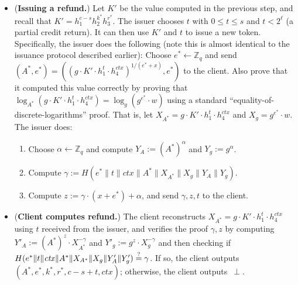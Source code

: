 \documentclass[11pt]{article}
\def\Z{{\mathbb Z}}
\def\Z{{\mathbb Z}}
\def\isequal{\stackrel{\rm ?}{=}}
\begin{document}
\begin{itemize}
\item ({\bf Issuing a refund.}) Let $K'$ be the value computed in the previous step, and recall that $K'=h_1^{c-s} h_2^{k^*} h_3^{r^*}$. The issuer chooses $t$ with $0 \leq t \leq s$ and $t < 2^\ell$ (a partial credit return). It can then use $K'$ and $t$ to issue a new token.
Specifically, the issuer does the following (note this is almost identical to the issuance protocol described earlier):
Choose
$e^* \leftarrow \Z_q$ and send
$(A^*, e^*) = \left(\left(g \cdot K' \cdot h_1^t \cdot h_4^{\mathit{ctx}}\right)^{1/(e^*+x)}, e^*\right)$
to the client.
Also prove that it computed this value correctly by proving that $\log_{A^*} \left(g \cdot K' \cdot h_1^t \cdot h_4^{\mathit{ctx}}\right) = \log_g \left(g^{e^*} \cdot w\right)$ using a standard ``equality-of-discrete-logarithms'' proof.
That is, let $X_{A^*} = g \cdot K' \cdot h_1^t \cdot h_4^{\mathit{ctx}}$ and $X_g = g^{e^*} \cdot w$. The issuer does:
\begin{enumerate}
    \item Choose $\alpha \leftarrow \Z_q$ and compute $Y_A:= (A^*)^{\alpha}$ and $Y_g:=g^\alpha$.
    \item Compute $\gamma:=H(e^*\|t\|\mathit{ctx}\|A^*\|X_{A^*}\|X_g\|Y_A\|Y_g)$.
    \item Compute $z:=\gamma\cdot (x+e^*)+\alpha$, and send $\gamma, z, t$ to the client.
\end{enumerate}

\item ({\bf Client computes refund.}) The client reconstructs $X_{A^*} = g \cdot K' \cdot h_1^t \cdot h_4^{\mathit{ctx}}$ using $t$ received from the issuer, and verifies the proof $\gamma, z$ by computing $Y'_A:= (A^*)^z \cdot X_{A^*}^{-\gamma}$ and $Y'_g:=g^z \cdot X_g^{-\gamma}$ and then
checking if
$H( e^*\|t\|\mathit{ctx}\|A^*\|X_{A^*}\|X_g\|Y'_A \| Y'_g ) \isequal \gamma$. If so, the client outputs $(A^*, e^*, k^*, r^*, c-s+t, \mathit{ctx})$; otherwise, the client outputs~$\perp$.
\end{itemize}
\end{document}
